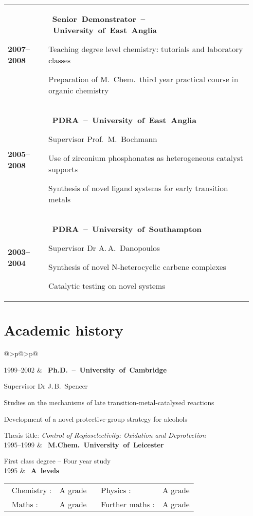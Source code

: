 \documentclass[11pt,draft]{article}
\makeatletter
\renewcommand*\arraystretch{1.4}
\newlength\sidewidth
\newlength\mainwidth
\newcommand*\headline[1]{%
  \hbox{%
    \llap{\ding{72}\hspace*{0.2 em}}%
    \textbf{#1}%
  }%
}
\newenvironment{CVtable}
  {%
    \begin{tabular}
      {@{}>{\bfseries}p{\sidewidth}@{}>{\RaggedRight}p{\mainwidth}@{}}%
  }
  {\end{tabular}}
\makeatother
\begin{document}
\begin{CVtable}
  2007--2008 &
    \headline{Senior Demonstrator -- University of East Anglia} \par
    Teaching degree level chemistry:
    tutorials and laboratory classes \par
    Preparation of M.~Chem.~third year practical course in
    organic chemistry
  \\
      
  2005--2008 &
    \headline{PDRA -- University of East Anglia} \par 
    Supervisor Prof.~M.~Bochmann \par 
    Use of zirconium phosphonates as heterogeneous catalyst supports \par
    Synthesis of novel ligand systems for early transition metals
  \\

  2003--2004 & 
    \headline{PDRA -- University of Southampton} \par
    Supervisor Dr A.\,A.~Danopoulos \par
    Synthesis of novel N-heterocyclic carbene complexes \par
    Catalytic testing on novel systems
  \\
\end{CVtable}

\section{Academic history}

\begin{CVtable}
  1999--2002 &
    \headline{Ph.D. -- University of Cambridge} \par
    Supervisor Dr J.\,B.~Spencer \par
    Studies on the mechanisms of late transition-metal-catalysed 
    reactions \par
    Development of a novel protective-group strategy for alcohols \par
    Thesis title:
      \emph{Control of Regioselectivity: Oxidation and Deprotection}
  \\

  1995--1999 &
    \headline{M.Chem. University of Leicester} \par
    First class degree -- Four year study 
  \\
   
  1995 &
    \headline{A levels} \par
    \vspace{0.25 em}
    \begingroup
      \renewcommand*\arraystretch{1}
      \begin{tabular}
        {@{}>{\textbullet~}l<{:}l>{\textbullet~}l<{:}l}
        Chemistry & A grade & Physics       & A grade \\
        Maths     & A grade & Further maths & A grade \\
      \end{tabular}
    \endgroup   
\end{CVtable}
\end{document}
